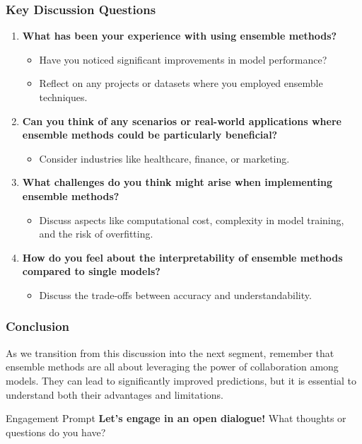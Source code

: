 \documentclass[aspectratio=169]{beamer}
\begin{document}
\begin{frame}[fragile]
    \frametitle{Key Discussion Questions}
    \begin{enumerate}
        \item \textbf{What has been your experience with using ensemble methods?}
            \begin{itemize}
                \item Have you noticed significant improvements in model performance?
                \item Reflect on any projects or datasets where you employed ensemble techniques.
            \end{itemize}
        \item \textbf{Can you think of any scenarios or real-world applications where ensemble methods could be particularly beneficial?}
            \begin{itemize}
                \item Consider industries like healthcare, finance, or marketing.
            \end{itemize}
        \item \textbf{What challenges do you think might arise when implementing ensemble methods?}
            \begin{itemize}
                \item Discuss aspects like computational cost, complexity in model training, and the risk of overfitting.
            \end{itemize}
        \item \textbf{How do you feel about the interpretability of ensemble methods compared to single models?}
            \begin{itemize}
                \item Discuss the trade-offs between accuracy and understandability.
            \end{itemize}
    \end{enumerate}
\end{frame}

\begin{frame}[fragile]
    \frametitle{Conclusion}
    As we transition from this discussion into the next segment, remember that ensemble methods are all about leveraging the power of collaboration among models. They can lead to significantly improved predictions, but it is essential to understand both their advantages and limitations.

    \begin{block}{Engagement Prompt}
        \textbf{Let’s engage in an open dialogue!} What thoughts or questions do you have?
    \end{block}
\end{frame}
\end{document}
